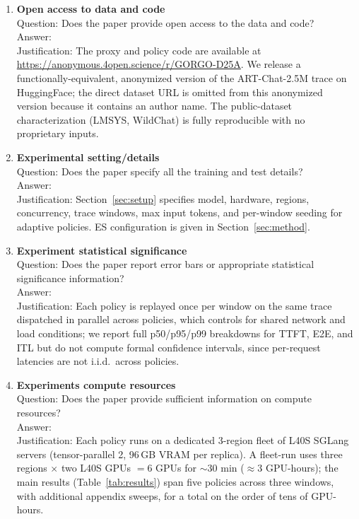 \documentclass{article}
\begin{document}
\begin{enumerate}
\item {\bf Open access to data and code}\\
Question: Does the paper provide open access to the data and code?\\
Answer: \answerYes{}\\
Justification: The proxy and policy code are available at \href{https://anonymous.4open.science/r/GORGO-D25A}{https://anonymous.4open.science/r/GORGO-D25A}. We release a functionally-equivalent, anonymized version of the ART-Chat-2.5M trace on HuggingFace; the direct dataset URL is omitted from this anonymized version because it contains an author name. The public-dataset characterization (LMSYS, WildChat) is fully reproducible with no proprietary inputs.

\item {\bf Experimental setting/details}\\
Question: Does the paper specify all the training and test details?\\
Answer: \answerYes{}\\
Justification: Section~\ref{sec:setup} specifies model, hardware, regions, concurrency, trace windows, max input tokens, and per-window seeding for adaptive policies. ES configuration is given in Section~\ref{sec:method}.

\item {\bf Experiment statistical significance}\\
Question: Does the paper report error bars or appropriate statistical significance information?\\
Answer: \answerNo{}\\
Justification: Each policy is replayed once per window on the same trace dispatched in parallel across policies, which controls for shared network and load conditions; we report full p50/p95/p99 breakdowns for TTFT, E2E, and ITL but do not compute formal confidence intervals, since per-request latencies are not i.i.d.\ across policies.

\item {\bf Experiments compute resources}\\
Question: Does the paper provide sufficient information on compute resources?\\
Answer: \answerYes{}\\
Justification: Each policy runs on a dedicated 3-region fleet of L40S SGLang servers (tensor-parallel 2, 96\,GB VRAM per replica). A fleet-run uses three regions $\times$ two L40S GPUs $= 6$ GPUs for $\sim$30 min ($\approx$3 GPU-hours); the main results (Table~\ref{tab:results}) span five policies across three windows, with additional appendix sweeps, for a total on the order of tens of GPU-hours.


\end{enumerate}
\end{document}
